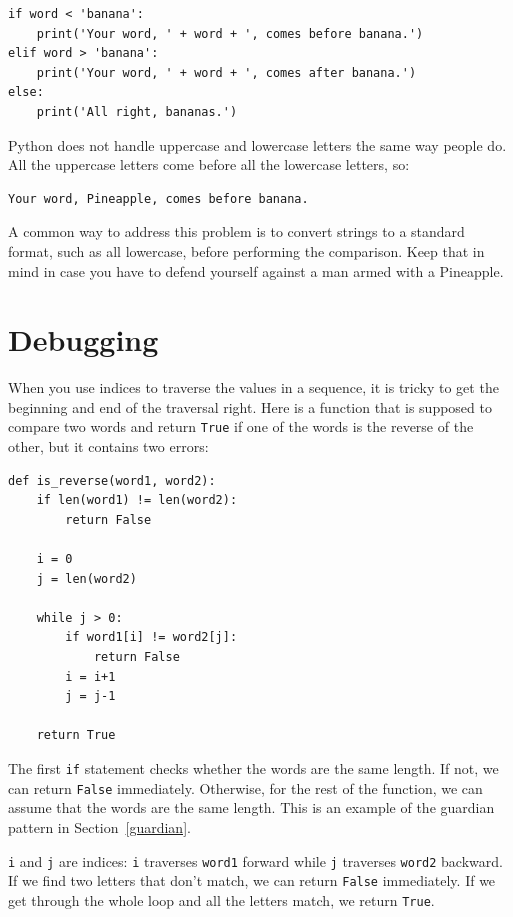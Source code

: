 \documentclass[10pt]{book}
\begin{document}
\begin{verbatim}
if word < 'banana':
    print('Your word, ' + word + ', comes before banana.')
elif word > 'banana':
    print('Your word, ' + word + ', comes after banana.')
else:
    print('All right, bananas.')
\end{verbatim}
%
Python does not handle uppercase and lowercase letters the same way
people do.  All the uppercase letters come before all the
lowercase letters, so:

\begin{verbatim}
Your word, Pineapple, comes before banana.
\end{verbatim}
%
A common way to address this problem is to convert strings to a
standard format, such as all lowercase, before performing the
comparison.  Keep that in mind in case you have to defend yourself
against a man armed with a Pineapple.


\section{Debugging}

When you use indices to traverse the values in a sequence,
it is tricky to get the beginning and end of the traversal
right.  Here is a function that is supposed to compare two
words and return {\tt True} if one of the words is the reverse
of the other, but it contains two errors:

\begin{verbatim}
def is_reverse(word1, word2):
    if len(word1) != len(word2):
        return False
    
    i = 0
    j = len(word2)

    while j > 0:
        if word1[i] != word2[j]:
            return False
        i = i+1
        j = j-1

    return True
\end{verbatim}
%
The first {\tt if} statement checks whether the words are the
same length.  If not, we can return {\tt False} immediately.
Otherwise, for the rest of the function, we can assume that the words
are the same length.  This is an example of the guardian pattern
in Section~\ref{guardian}.

{\tt i} and {\tt j} are indices: {\tt i} traverses {\tt word1}
forward while {\tt j} traverses {\tt word2} backward.  If we find
two letters that don't match, we can return {\tt False} immediately.
If we get through the whole loop and all the letters match, we
return {\tt True}.
\end{document}
